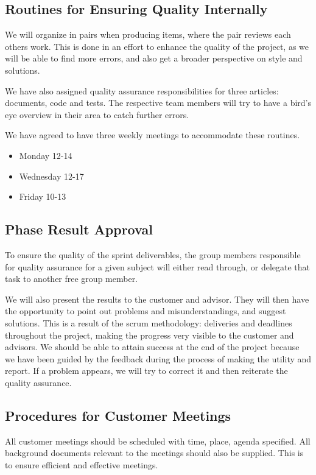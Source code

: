 \subsection{Routines for Ensuring Quality Internally}
We will organize in pairs when producing items, where the pair reviews each others work. This is done in an effort to enhance the quality of the project, as we will be able to find more errors, and 
also get a broader perspective on style and solutions.

We have also assigned quality assurance responsibilities for three articles: documents, code and tests. The respective team members will try to have a bird's eye overview in their area to catch further errors.

We have agreed to have three weekly meetings to accommodate these routines.
\begin{itemize}
	\item Monday 12-14
	\item Wednesday 12-17
	\item Friday 10-13
\end{itemize}

\subsection{Phase Result Approval}
To ensure the quality of the sprint deliverables, the group members responsible for quality assurance for a given subject will either read through, or delegate that task to another free group member.

We will also present the results to the customer and advisor. They will then have the opportunity to point out problems and misunderstandings, and suggest solutions. This is a result of the \Gls{scrum} methodology: deliveries and deadlines throughout the project, making the progress very visible to the customer and advisors. We should be able to attain success at the end of the project because we have been guided by the feedback during the process of making the utility and report. If a problem appears, we will try to correct it and then reiterate the quality assurance.

\subsection{Procedures for Customer Meetings}
All customer meetings should be scheduled with time, place, agenda specified. All background documents relevant to the meetings should also be supplied. This is to ensure efficient and effective meetings.

